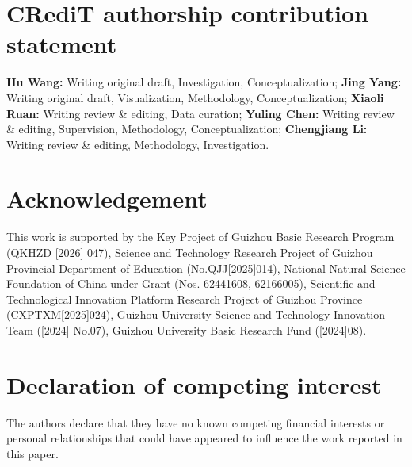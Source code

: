
\section*{CRediT authorship contribution statement}
\textbf{Hu Wang:} Writing \textendash{} original draft, Investigation, Conceptualization; \textbf{Jing Yang:} Writing \textendash{} original draft, Visualization, Methodology, Conceptualization; \textbf{Xiaoli Ruan:} Writing \textendash{} review \& editing, Data curation; \textbf{Yuling Chen:} Writing \textendash{} review \& editing, Supervision, Methodology, Conceptualization; \textbf{Chengjiang Li:} Writing \textendash{} review \& editing, Methodology, Investigation.

\section*{Acknowledgement}
This work is supported by the Key Project of Guizhou Basic Research Program (QKHZD [2026] 047), Science and Technology Research Project of Guizhou Provincial Department of Education (No.QJJ[2025]014), National Natural Science Foundation of China under Grant (Nos. 62441608, 62166005), Scientific and Technological Innovation Platform Research Project of Guizhou Province (CXPTXM[2025]024), Guizhou University Science and Technology Innovation Team ([2024] No.07), Guizhou University Basic Research Fund ([2024]08).

\section*{Declaration of competing interest}
The authors declare that they have no known competing financial interests or personal relationships that could have appeared to influence the work reported in this paper.

